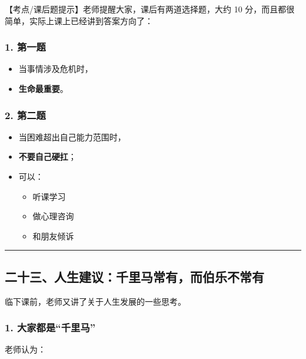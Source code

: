 \documentclass[
  chinese,
  9pt,
  a4paper,
]{ctexart}
\providecommand{\tightlist}{%
  \setlength{\itemsep}{0pt}\setlength{\parskip}{0pt}}
\begin{document}
【考点/课后题提示】老师提醒大家，课后有两道选择题，大约 10
分，而且都很简单，实际上课上已经讲到答案方向了：

\subsubsection{1. 第一题}\label{ux7b2cux4e00ux9898}

\begin{itemize}
\tightlist
\item
  当事情涉及危机时，
\item
  \textbf{生命最重要}。
\end{itemize}

\subsubsection{2. 第二题}\label{ux7b2cux4e8cux9898}

\begin{itemize}
\item
  当困难超出自己能力范围时，
\item
  \textbf{不要自己硬扛}；
\item
  可以：

  \begin{itemize}
  \tightlist
  \item
    听课学习
  \item
    做心理咨询
  \item
    和朋友倾诉
  \end{itemize}
\end{itemize}

\begin{center}\rule{0.5\linewidth}{0.5pt}\end{center}

\subsection{二十三、人生建议：千里马常有，而伯乐不常有}\label{ux4e8cux5341ux4e09ux4ebaux751fux5efaux8baeux5343ux91ccux9a6cux5e38ux6709ux800cux4f2fux4e50ux4e0dux5e38ux6709}

临下课前，老师又讲了关于人生发展的一些思考。

\subsubsection{1.
大家都是``千里马''}\label{ux5927ux5bb6ux90fdux662fux5343ux91ccux9a6c}

老师认为：
\end{document}
